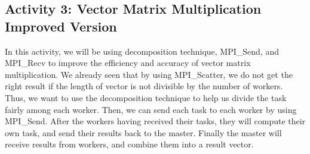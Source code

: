 \documentclass[letterpaper,10pt,openany,oneside]{sphinxmanual}
\begin{document}
\subsection{Activity 3: Vector Matrix Multiplication Improved Version}
\label{DecompositionAndActivity/DecompositionAndActivity:activity-3-vector-matrix-multiplication-improved-version}
In this activity, we will be using decomposition technique, MPI\_Send, and MPI\_Recv to
improve the efficiency and accuracy of vector matrix multiplication. We already seen that by using
MPI\_Scatter, we do not get the right result if the length of vector is not divisible by
the number of workers. Thus, we want to use the decomposition technique to help us divide
the task fairly among each worker. Then, we can send each task to each worker by using MPI\_Send.
After the workers having received their tasks, they will compute their own task, and send their results
back to the master. Finally the master will receive results from workers, and combine them into a result vector.
\end{document}
